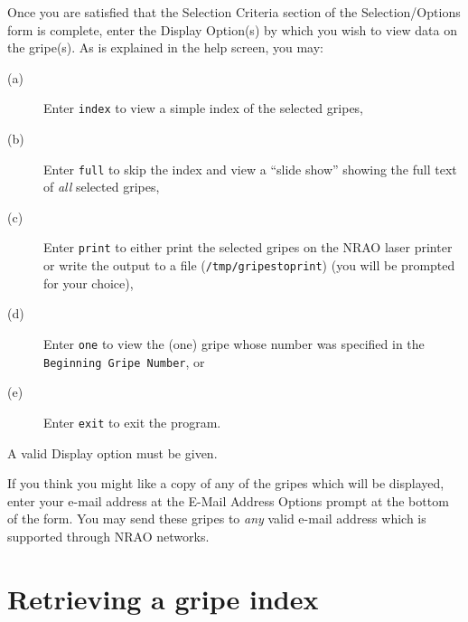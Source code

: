 Once you are satisfied that the Selection Criteria section of the
Selection/Options form is complete, enter the Display Option(s) by
which you wish to view data on the gripe(s).  As is explained in the
help screen, you may:
\begin{description}
\item[(a) ] Enter {\tt index} to view a simple index of the selected
                 gripes,
\item[(b) ] Enter {\tt full} to skip the index and view a ``slide
                 show'' showing the full text of {\it all} selected
                 gripes,
\item[(c) ] Enter {\tt print} to either print the selected gripes on
                 the NRAO laser printer or write the output to a file
                 ({\tt /tmp/gripestoprint}) (you will be prompted for
                 your choice),
\item[(d) ] Enter {\tt one} to view the (one) gripe whose number was
                 specified in the {\tt Beginning Gripe Number}, or
\item[(e) ] Enter {\tt exit} to exit the program.
\end{description}
A valid Display option must be given.

If you think you might like a copy of any of the gripes which will be
displayed, enter your e-mail address at the E-Mail Address Options
prompt at the bottom of the form.  You may send these gripes to {\it
any} valid e-mail address which is supported through NRAO networks.


\section{Retrieving a gripe index}

